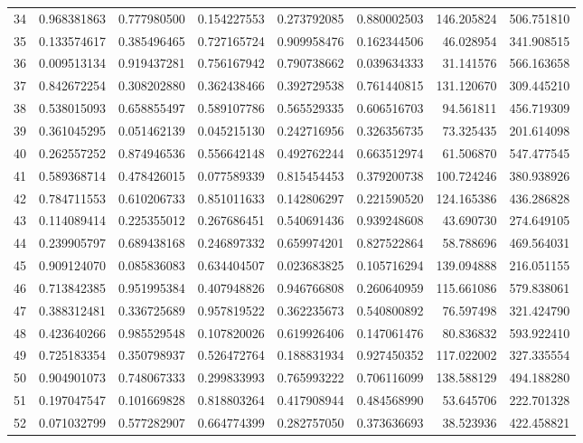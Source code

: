 \begin{longtable}{rrrrrrrr}
34 & 0.968381863 & 0.777980500 & 0.154227553 & 0.273792085 & 0.880002503 & 146.205824 & 506.751810 \\
35 & 0.133574617 & 0.385496465 & 0.727165724 & 0.909958476 & 0.162344506 & 46.028954 & 341.908515 \\
36 & 0.009513134 & 0.919437281 & 0.756167942 & 0.790738662 & 0.039634333 & 31.141576 & 566.163658 \\
37 & 0.842672254 & 0.308202880 & 0.362438466 & 0.392729538 & 0.761440815 & 131.120670 & 309.445210 \\
38 & 0.538015093 & 0.658855497 & 0.589107786 & 0.565529335 & 0.606516703 & 94.561811 & 456.719309 \\
39 & 0.361045295 & 0.051462139 & 0.045215130 & 0.242716956 & 0.326356735 & 73.325435 & 201.614098 \\
40 & 0.262557252 & 0.874946536 & 0.556642148 & 0.492762244 & 0.663512974 & 61.506870 & 547.477545 \\
41 & 0.589368714 & 0.478426015 & 0.077589339 & 0.815454453 & 0.379200738 & 100.724246 & 380.938926 \\
42 & 0.784711553 & 0.610206733 & 0.851011633 & 0.142806297 & 0.221590520 & 124.165386 & 436.286828 \\
43 & 0.114089414 & 0.225355012 & 0.267686451 & 0.540691436 & 0.939248608 & 43.690730 & 274.649105 \\
44 & 0.239905797 & 0.689438168 & 0.246897332 & 0.659974201 & 0.827522864 & 58.788696 & 469.564031 \\
45 & 0.909124070 & 0.085836083 & 0.634404507 & 0.023683825 & 0.105716294 & 139.094888 & 216.051155 \\
46 & 0.713842385 & 0.951995384 & 0.407948826 & 0.946766808 & 0.260640959 & 115.661086 & 579.838061 \\
47 & 0.388312481 & 0.336725689 & 0.957819522 & 0.362235673 & 0.540800892 & 76.597498 & 321.424790 \\
48 & 0.423640266 & 0.985529548 & 0.107820026 & 0.619926406 & 0.147061476 & 80.836832 & 593.922410 \\
49 & 0.725183354 & 0.350798937 & 0.526472764 & 0.188831934 & 0.927450352 & 117.022002 & 327.335554 \\
50 & 0.904901073 & 0.748067333 & 0.299833993 & 0.765993222 & 0.706116099 & 138.588129 & 494.188280 \\
51 & 0.197047547 & 0.101669828 & 0.818803264 & 0.417908944 & 0.484568990 & 53.645706 & 222.701328 \\
52 & 0.071032799 & 0.577282907 & 0.664774399 & 0.282757050 & 0.373636693 & 38.523936 & 422.458821 \\

\end{longtable}
